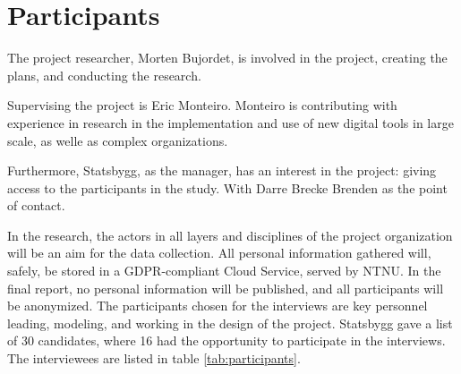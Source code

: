 \section{Participants}
The project researcher, Morten Bujordet, is involved in the project, creating the plans, and conducting the research.
	 
Supervising the project is Eric Monteiro. Monteiro is contributing with experience in research in the implementation and use of new digital tools in large scale, as welle as complex organizations. 

Furthermore, Statsbygg, as the manager, has an interest in the project: giving access to the participants in the study. With Darre Brecke Brenden as the point of contact.
	 
In the research, the actors in all layers and disciplines of the project organization will be an aim for the data collection. All personal information gathered will, safely, be stored in a GDPR-compliant Cloud Service, served by NTNU. In the final report, no personal information will be published, and all participants will be anonymized. The participants chosen for the interviews are key personnel leading, modeling, and working in the design of the project. Statsbygg gave a list of 30 candidates, where 16 had the opportunity to participate in the interviews. The interviewees are listed in table \ref{tab:participants}. 

